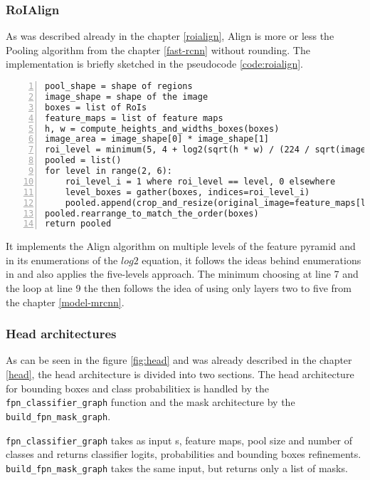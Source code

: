 \subsubsection{RoIAlign}
\label{model-roi}

As was described already in the chapter \ref{roialign}, Align is more or less the Pooling algorithm from the chapter \ref{fast-rcnn} without rounding. The implementation is briefly sketched in the pseudocode \ref{code:roialign}.

{\scriptsize
\begin{lstlisting}[style=python, caption={RoIAlign}, captionpos=b, label=code:roialign, deletekeywords={from, input, map},
backgroundcolor = \color{light-gray}, numbers=left, breaklines=true]
pool_shape = shape of regions
image_shape = shape of the image
boxes = list of RoIs
feature_maps = list of feature maps
h, w = compute_heights_and_widths_boxes(boxes)
image_area = image_shape[0] * image_shape[1]
roi_level = minimum(5, 4 + log2(sqrt(h * w) / (224 / sqrt(image_area))))
pooled = list()
for level in range(2, 6):
    roi_level_i = 1 where roi_level == level, 0 elsewhere
    level_boxes = gather(boxes, indices=roi_level_i)
    pooled.append(crop_and_resize(original_image=feature_maps[level-2], what_process=level_boxes, shape=pool_shape, method='bilinear'))
pooled.rearrange_to_match_the_order(boxes)
return pooled
\end{lstlisting}}

It implements the Align algorithm on multiple levels of the feature pyramid and in its enumerations of the $log2$ equation, it follows the ideas behind enumerations in \cite{fpn} and also applies the five-levels approach. The minimum choosing at line 7 and the loop at line 9 the then follows the idea of using only layers two to five from the chapter \ref{model-mrcnn}.

\subsubsection{Head architectures}
\label{model-head}

As can be seen in the figure \ref{fig:head} and was already described in the chapter \ref{head}, the head architecture is divided into two sections. The head architecture for bounding boxes and class probabilitiex is handled by the \verb|fpn_classifier_graph| function and the mask architecture by the \verb|build_fpn_mask_graph|.

\verb|fpn_classifier_graph| takes as input s, feature maps, pool size and number of classes and returns classifier logits, probabilities and bounding boxes refinements. \verb|build_fpn_mask_graph| takes the same input, but returns only a list of masks.

